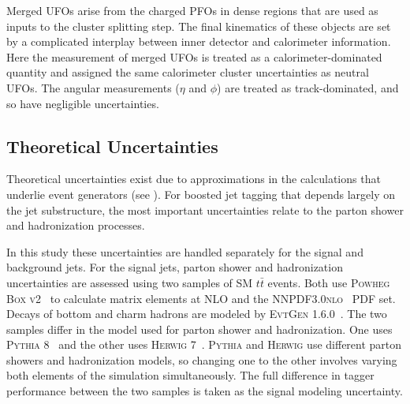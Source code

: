 Merged UFOs arise from the charged PFOs in dense regions that are used as inputs to the cluster splitting step.
The final kinematics of these objects are set by a complicated interplay between inner detector and calorimeter information.
Here the \pt measurement of merged UFOs is treated as a calorimeter-dominated quantity and assigned the same calorimeter cluster uncertainties as neutral UFOs.
The angular measurements ($\eta$ and $\phi$) are treated as track-dominated, and so have negligible uncertainties.

\subsection{Theoretical Uncertainties}

Theoretical uncertainties exist due to approximations in the calculations that underlie event generators (see ).
For boosted jet tagging that depends largely on the jet substructure, the most important uncertainties relate to the parton shower and hadronization processes.

In this study these uncertainties are handled separately for the signal and background jets.
For the signal jets, parton shower and hadronization uncertainties are assessed using two samples of SM $t\bar{t}$ events.
Both use \textsc{Powheg Box v2}~\cite{Frixione:2007vw, Nason:2004rx, Alioli:2010xd} to calculate matrix elements at NLO and the \textsc{NNPDF3.0nlo}~\cite{Ball:2014uwa} PDF set.
Decays of bottom and charm hadrons are modeled by \textsc{EvtGen 1.6.0}~\cite{Lange:2001uf}.
The two samples differ in the model used for parton shower and hadronization.
One uses \textsc{Pythia 8}~\cite{Sjostrand:2014zea} and the other uses \textsc{Herwig 7}~\cite{Bellm:2015jjp, Bahr:2008pv}.
\textsc{Pythia} and \textsc{Herwig} use different parton showers and hadronization models, so changing one to the other involves varying both elements of the simulation simultaneously.
The full difference in tagger performance between the two samples is taken as the signal modeling uncertainty.

